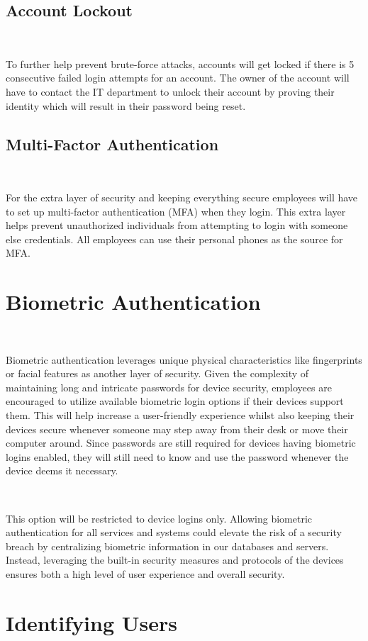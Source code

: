 \documentclass[12pt,a4paper]{report}
\begin{document}
\subsection{Account Lockout}
\

To further help prevent brute-force attacks, accounts will get locked if there is 5 consecutive failed login attempts for an account.
The owner of the account will have to contact the IT department to unlock their account by proving their identity which will result in their password being reset.

\subsection{Multi-Factor Authentication}
\

For the extra layer of security and keeping everything secure employees will have to set up multi-factor authentication (MFA) when they login.
This extra layer helps prevent unauthorized individuals from attempting to login with someone else credentials.
All employees can use their personal phones as the source for MFA.

\section{Biometric Authentication}
\

Biometric authentication leverages unique physical characteristics like fingerprints or facial features as another layer of security. 
Given the complexity of maintaining long and intricate passwords for device security, employees are encouraged to utilize available biometric login options if their devices support them.
This will help increase a user-friendly experience whilst also keeping their devices secure whenever someone may step away from their desk or move their computer around.
Since passwords are still required for devices having biometric logins enabled, they will still need to know and use the password whenever the device deems it necessary.

\

This option will be restricted to device logins only.
Allowing biometric authentication for all services and systems could elevate the risk of a security breach by centralizing biometric information in our databases and servers. 
Instead, leveraging the built-in security measures and protocols of the devices ensures both a high level of user experience and overall security.

\section{Identifying Users}
\
\end{document}
